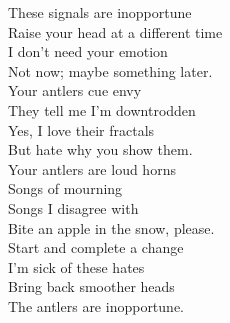 These signals are inopportune\\
Raise your head at a different time\\
I don't need your emotion\\
Not now; maybe something later.\\

Your antlers cue envy\\
They tell me I'm downtrodden\\
Yes, I love their fractals\\
But hate why you show them.\\

Your antlers are loud horns\\
Songs of mourning\\
Songs I disagree with\\
Bite an apple in the snow, please.\\

Start and complete a change\\
I'm sick of these hates\\
Bring back smoother heads\\
The antlers are inopportune.\\

